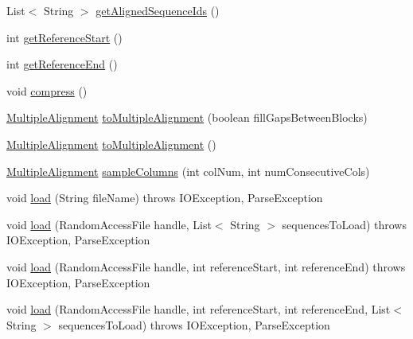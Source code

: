\begin{DoxyCompactItemize}
List$<$ String $>$ \hyperlink{classbroad_1_1core_1_1multiplealignment_1_1_m_a_f_alignment_a3b0364eae278b8e4a3524ed723cd563f}{get\+Aligned\+Sequence\+Ids} ()
\item 
int \hyperlink{classbroad_1_1core_1_1multiplealignment_1_1_m_a_f_alignment_a6b6655c27333075b60992c0a509aef72}{get\+Reference\+Start} ()
\item 
int \hyperlink{classbroad_1_1core_1_1multiplealignment_1_1_m_a_f_alignment_ac3c532409f19dd413db6111dea5b1bd1}{get\+Reference\+End} ()
\item 
void \hyperlink{classbroad_1_1core_1_1multiplealignment_1_1_m_a_f_alignment_a0b37804e6ca4cc55157e60670ed39a26}{compress} ()
\item 
\hyperlink{classbroad_1_1core_1_1multiplealignment_1_1_multiple_alignment}{Multiple\+Alignment} \hyperlink{classbroad_1_1core_1_1multiplealignment_1_1_m_a_f_alignment_a67a951c301889a39ee03968ed0d75494}{to\+Multiple\+Alignment} (boolean fill\+Gaps\+Between\+Blocks)
\item 
\hyperlink{classbroad_1_1core_1_1multiplealignment_1_1_multiple_alignment}{Multiple\+Alignment} \hyperlink{classbroad_1_1core_1_1multiplealignment_1_1_m_a_f_alignment_a1e317663633acc708a1ce6dc5944a58a}{to\+Multiple\+Alignment} ()
\item 
\hyperlink{classbroad_1_1core_1_1multiplealignment_1_1_multiple_alignment}{Multiple\+Alignment} \hyperlink{classbroad_1_1core_1_1multiplealignment_1_1_m_a_f_alignment_a53c281eb887b5cb250224b1bb1ff25b5}{sample\+Columns} (int col\+Num, int num\+Consecutive\+Cols)
\item 
void \hyperlink{classbroad_1_1core_1_1multiplealignment_1_1_m_a_f_alignment_a53742947267ae32efa009ea5aac96eb5}{load} (String file\+Name)  throws I\+O\+Exception, Parse\+Exception 
\item 
void \hyperlink{classbroad_1_1core_1_1multiplealignment_1_1_m_a_f_alignment_ad496855fe0314a911e501547a3d95ccc}{load} (Random\+Access\+File handle, List$<$ String $>$ sequences\+To\+Load)  throws I\+O\+Exception, Parse\+Exception 
\item 
void \hyperlink{classbroad_1_1core_1_1multiplealignment_1_1_m_a_f_alignment_ab4158846322c70318f9f27ed42656698}{load} (Random\+Access\+File handle, int reference\+Start, int reference\+End)  throws I\+O\+Exception, Parse\+Exception 
\item 
void \hyperlink{classbroad_1_1core_1_1multiplealignment_1_1_m_a_f_alignment_a5c27232aa71cd8c0db9c1647b1c3e4c2}{load} (Random\+Access\+File handle, int reference\+Start, int reference\+End, List$<$ String $>$ sequences\+To\+Load)  throws I\+O\+Exception, Parse\+Exception 

\end{DoxyCompactItemize}
